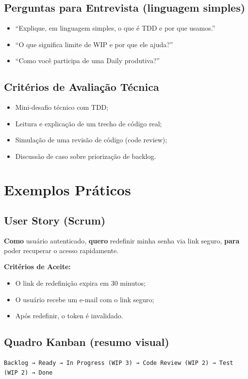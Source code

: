 \documentclass{article}
\begin{document}
\subsection*{Perguntas para Entrevista (linguagem simples)}
\begin{itemize}[noitemsep]
    \item “Explique, em linguagem simples, o que é TDD e por que usamos.”
    \item “O que significa limite de WIP e por que ele ajuda?”
    \item “Como você participa de uma Daily produtiva?”
\end{itemize}

\subsection*{Critérios de Avaliação Técnica}
\begin{itemize}[noitemsep]
    \item Mini-desafio técnico com TDD;
    \item Leitura e explicação de um trecho de código real;
    \item Simulação de uma revisão de código (code review);
    \item Discussão de caso sobre priorização de backlog.
\end{itemize}

\section{Exemplos Práticos}

\subsection*{User Story (Scrum)}
\textbf{Como} usuário autenticado,  
\textbf{quero} redefinir minha senha via link seguro,  
\textbf{para} poder recuperar o acesso rapidamente.  

\textbf{Critérios de Aceite:}
\begin{itemize}[noitemsep]
    \item O link de redefinição expira em 30 minutos;
    \item O usuário recebe um e-mail com o link seguro;
    \item Após redefinir, o token é invalidado.
\end{itemize}

\subsection*{Quadro Kanban (resumo visual)}
\begin{center}
\texttt{Backlog → Ready → In Progress (WIP 3) → Code Review (WIP 2) → Test (WIP 2) → Done}
\end{center}
\end{document}
